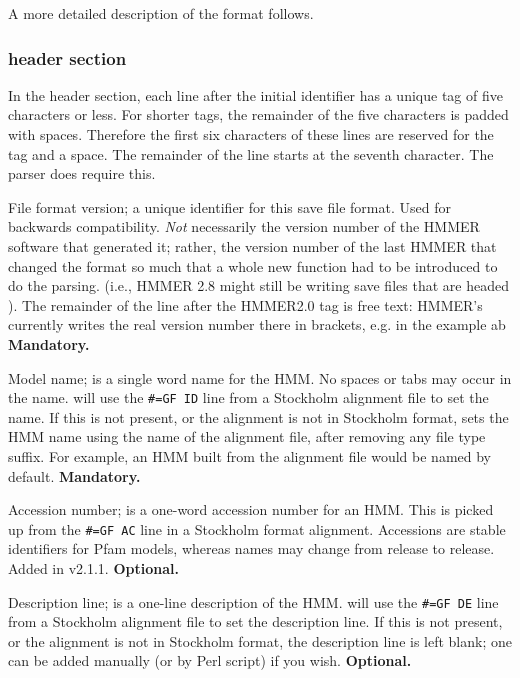 A more detailed description of the format follows.

\subsubsection{header section}

In the header section, each line after the initial identifier has a
unique tag of five characters or less. For shorter tags, the remainder
of the five characters is padded with spaces. Therefore the first six
characters of these lines are reserved for the tag and a space. The
remainder of the line starts at the seventh character. The parser does
require this.

\begin{wideitem}

\item [\emprog{HMMER2.0}]
File format version; a unique identifier for this save file
format. Used for backwards compatibility. {\em Not} necessarily the
version number of the HMMER software that generated it; rather, the
version number of the last HMMER that changed the format so much
that a whole new function had to be introduced to do the parsing.
(i.e., HMMER 2.8 might
still be writing save files that are headed ).
The remainder of the line after the HMMER2.0 tag is free text:
HMMER's  currently writes the real version number
there in brackets, e.g. \prog{[2.3]} in the example ab
\textbf{Mandatory.}

\item [\emprog{NAME  <s>}] Model name;  is a single word name for the HMM.
No spaces or tabs may occur in the name. 
 will use the \verb+#=GF ID+ line from a Stockholm alignment
file to set the name. If this is not present, or the alignment
is not in Stockholm format, 
sets the HMM name using the name of the alignment file, after removing any
file type suffix. For example, an HMM built from the alignment file
 would be named  by default.
\textbf{Mandatory.}

\item [\emprog{ACC <s>}] Accession number;  is a one-word
accession number for an HMM. This is picked up from the \verb+#=GF AC+
line in a Stockholm format alignment.  Accessions are stable
identifiers for Pfam models, whereas names may change from release to
release. Added in v2.1.1.  \textbf{Optional.}

\item [\emprog{DESC  <s>}] Description line;  is a one-line description 
of the HMM.  will use the \verb+#=GF DE+ line from a
Stockholm alignment file to set the description line. If this is not
present, or the alignment is not in Stockholm format, the description
line is left blank; one can be added manually (or by Perl script)
if you wish. \textbf{Optional.}


\end{wideitem}
